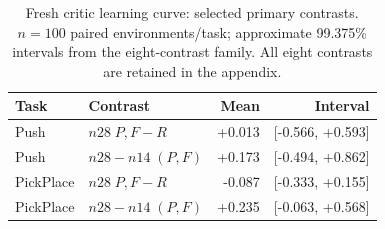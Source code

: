 \begin{table}[tb]
\centering\small
\caption{Fresh critic learning curve: selected primary contrasts. $n=100$ paired environments/task; approximate 99.375\% intervals from the eight-contrast family. All eight contrasts are retained in the appendix.}\label{tab:curve}
\begin{tabular}{llrr}
\toprule Task & Contrast & Mean & Interval\\
\midrule
Push & $n28\;P,F-R$ & +0.013 & [-0.566, +0.593]\\
Push & $n28-n14\;(P,F)$ & +0.173 & [-0.494, +0.862]\\
PickPlace & $n28\;P,F-R$ & -0.087 & [-0.333, +0.155]\\
PickPlace & $n28-n14\;(P,F)$ & +0.235 & [-0.063, +0.568]\\
\bottomrule
\end{tabular}
\end{table}
